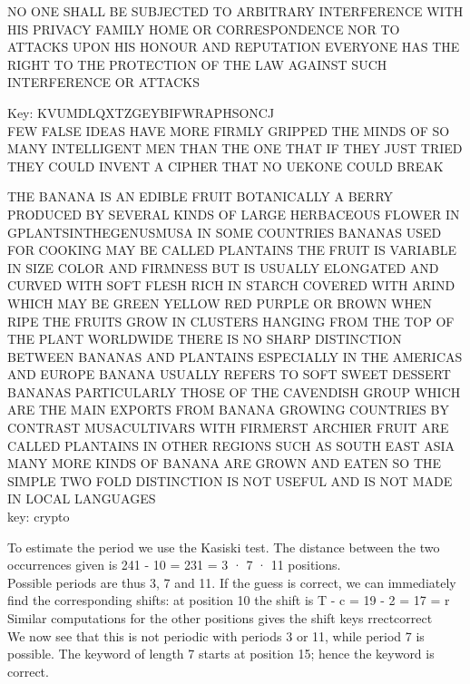 \documentclass[12pt,a4paper]{article}
\begin{document}
\frontpart

 \exercise
	NO ONE SHALL BE SUBJECTED TO ARBITRARY INTERFERENCE WITH HIS PRIVACY FAMILY HOME OR CORRESPONDENCE NOR TO ATTACKS UPON HIS HONOUR AND REPUTATION EVERYONE HAS THE RIGHT TO THE PROTECTION OF THE LAW AGAINST SUCH INTERFERENCE OR ATTACKS

	

 \exercise
 	Key: KVUMDLQXTZGEYBIFWRAPHSONCJ \\
 	\newline
 	FEW FALSE IDEAS HAVE MORE FIRMLY GRIPPED THE MINDS OF SO MANY INTELLIGENT MEN THAN THE ONE THAT IF THEY JUST TRIED THEY COULD INVENT A CIPHER THAT NO UEKONE COULD BREAK

 \exercise
 	THE BANANA IS AN EDIBLE FRUIT BOTANICALLY A BERRY PRODUCED BY SEVERAL KINDS OF LARGE HERBACEOUS FLOWER IN GPLANTSINTHEGENUSMUSA IN SOME COUNTRIES BANANAS 
	USED FOR COOKING MAY BE CALLED PLANTAINS THE FRUIT IS VARIABLE IN SIZE COLOR AND FIRMNESS BUT IS USUALLY ELONGATED AND CURVED WITH SOFT FLESH RICH IN STARCH
	COVERED WITH ARIND WHICH MAY BE GREEN YELLOW RED PURPLE OR BROWN WHEN RIPE THE FRUITS GROW IN CLUSTERS HANGING FROM THE TOP OF THE PLANT WORLDWIDE
	THERE IS NO SHARP DISTINCTION BETWEEN BANANAS AND PLANTAINS ESPECIALLY IN THE AMERICAS AND EUROPE BANANA USUALLY REFERS TO SOFT SWEET DESSERT BANANAS 
	PARTICULARLY THOSE OF THE CAVENDISH GROUP WHICH ARE THE MAIN EXPORTS FROM BANANA GROWING COUNTRIES BY CONTRAST MUSACULTIVARS WITH FIRMERST ARCHIER FRUIT ARE CALLED 
	PLANTAINS IN OTHER REGIONS SUCH AS SOUTH EAST ASIA MANY MORE KINDS OF BANANA ARE GROWN AND EATEN SO THE SIMPLE TWO FOLD DISTINCTION IS NOT USEFUL AND IS NOT 
	MADE IN LOCAL LANGUAGES \\
	\newline 
	\noindent key: crypto


 \exercise
 To estimate the period we use the Kasiski test. The distance between the two occurrences  given is
 241 - 10 = 231 = 3 · 7 · 11  positions.\\

 Possible periods are thus 3, 7 and 11. If the guess is correct, we can immediately find the
 corresponding shifts: at position 10 the shift is T - c = 19 - 2 = 17 = r\\
 
 Similar computations for the other positions gives the shift keys
 rrectcorrect\\
 
 We now see that this is not periodic with periods 3 or 11, while period 7 is possible. The keyword
 of length 7 starts at position 15; hence the keyword is
 correct. 
\end{document}
